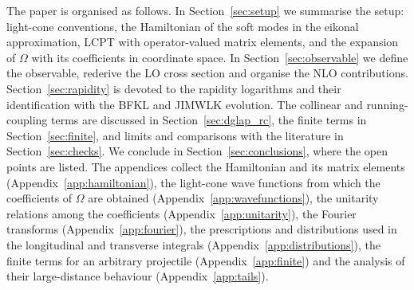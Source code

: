 The paper is organised as follows. In Section~\ref{sec:setup} we summarise the setup: light-cone conventions, the Hamiltonian of the soft modes in the eikonal approximation, LCPT with operator-valued matrix elements, and the expansion of $\Omega$ with its coefficients in coordinate space. In Section~\ref{sec:observable} we define the observable, rederive the LO cross section and organise the NLO contributions. Section~\ref{sec:rapidity} is devoted to the rapidity logarithms and their identification with the BFKL and JIMWLK evolution. The collinear and running-coupling terms are discussed in Section~\ref{sec:dglap_rc}, the finite terms in Section~\ref{sec:finite}, and limits and comparisons with the literature in Section~\ref{sec:checks}. We conclude in Section~\ref{sec:conclusions}, where the open points are listed. The appendices collect the Hamiltonian and its matrix elements (Appendix~\ref{app:hamiltonian}), the light-cone wave functions from which the coefficients of $\Omega$ are obtained (Appendix~\ref{app:wavefunctions}), the unitarity relations among the coefficients (Appendix~\ref{app:unitarity}), the Fourier transforms (Appendix~\ref{app:fourier}), the prescriptions and distributions used in the longitudinal and transverse integrals (Appendix~\ref{app:distributions}), the finite terms for an arbitrary projectile (Appendix~\ref{app:finite}) and the analysis of their large-distance behaviour (Appendix~\ref{app:tails}).
